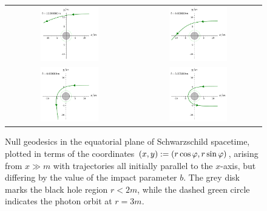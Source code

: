 \begin{figure}
\begin{tabular}{cc}
\includegraphics[width=0.48\textwidth]{ges_null_b_12_000000.pdf} &
\includegraphics[width=0.48\textwidth]{ges_null_b_8_000000.pdf} \\
\includegraphics[width=0.48\textwidth]{ges_null_b_6_000000.pdf} &
\includegraphics[width=0.48\textwidth]{ges_null_b_5_355000.pdf}
\end{tabular}
\caption[]{\label{f:gis:null_b1} \footnotesize
Null geodesics in the equatorial plane of Schwarzschild spacetime,
plotted in terms of the coordinates $(x,y) := (r\cos\varphi, r\sin\varphi)$,
arising from $x\gg m$ with trajectories all initially parallel to the $x$-axis,
but differing by the value of the impact parameter $b$.
The grey disk marks the black hole
region $r<2m$, while the dashed green circle indicates the photon orbit
at $r=3m$.}
\end{figure}

